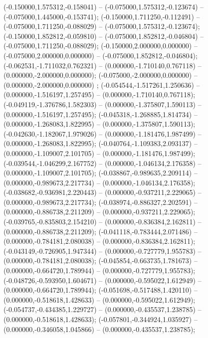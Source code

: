  (-0.150000,1.575312,-0.158041) -- (-0.075000,1.575312,-0.123674) -- (-0.075000,1.445000,-0.153741);
 (-0.150000,1.711250,-0.112491) -- (-0.075000,1.711250,-0.088029) -- (-0.075000,1.575312,-0.123674);
 (-0.150000,1.852812,-0.059810) -- (-0.075000,1.852812,-0.046804) -- (-0.075000,1.711250,-0.088029);
 (-0.150000,2.000000,0.000000) -- (-0.075000,2.000000,0.000000) -- (-0.075000,1.852812,-0.046804);
 (-0.062531,-1.711032,0.762321) -- (0.000000,-1.710140,0.767118) -- (0.000000,-2.000000,0.000000);
 (-0.075000,-2.000000,0.000000) -- (0.000000,-2.000000,0.000000) ;
 (-0.054544,-1.517261,1.250636) -- (0.000000,-1.516197,1.257495) -- (0.000000,-1.710140,0.767118);
 (-0.049119,-1.376786,1.582303) -- (0.000000,-1.375807,1.590113) -- (0.000000,-1.516197,1.257495);
 (-0.045318,-1.268885,1.814734) -- (0.000000,-1.268083,1.822995) -- (0.000000,-1.375807,1.590113);
 (-0.042630,-1.182067,1.979026) -- (0.000000,-1.181476,1.987499) -- (0.000000,-1.268083,1.822995);
 (-0.040764,-1.109383,2.093137) -- (0.000000,-1.109007,2.101705) -- (0.000000,-1.181476,1.987499);
 (-0.039544,-1.046299,2.167752) -- (0.000000,-1.046134,2.176358) -- (0.000000,-1.109007,2.101705);
 (-0.038867,-0.989635,2.209114) -- (0.000000,-0.989673,2.217734) -- (0.000000,-1.046134,2.176358);
 (-0.038682,-0.936981,2.220443) -- (0.000000,-0.937211,2.229065) -- (0.000000,-0.989673,2.217734);
 (-0.038974,-0.886327,2.202591) -- (0.000000,-0.886738,2.211209) -- (0.000000,-0.937211,2.229065);
 (-0.039765,-0.835803,2.154210) -- (0.000000,-0.836384,2.162811) -- (0.000000,-0.886738,2.211209);
 (-0.041118,-0.783444,2.071486) -- (0.000000,-0.784181,2.080038) -- (0.000000,-0.836384,2.162811);
 (-0.043149,-0.726905,1.947344) -- (0.000000,-0.727779,1.955783) -- (0.000000,-0.784181,2.080038);
 (-0.045854,-0.663735,1.781673) -- (0.000000,-0.664720,1.789944) -- (0.000000,-0.727779,1.955783);
 (-0.048726,-0.593950,1.604671) -- (0.000000,-0.595022,1.612949) -- (0.000000,-0.664720,1.789944);
 (-0.051698,-0.517488,1.420110) -- (0.000000,-0.518618,1.428633) -- (0.000000,-0.595022,1.612949);
 (-0.054737,-0.434385,1.229727) -- (0.000000,-0.435537,1.238785) -- (0.000000,-0.518618,1.428633);
 (-0.057801,-0.344924,1.035927) -- (0.000000,-0.346058,1.045866) -- (0.000000,-0.435537,1.238785);
